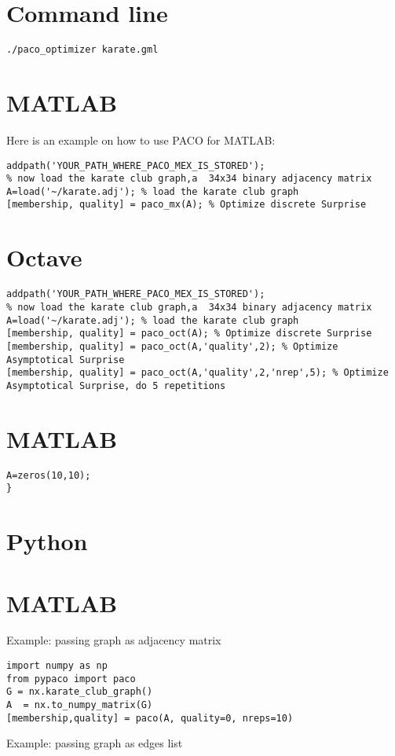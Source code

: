 \documentclass[11pt,%
              a4paper,%
]{article}
\begin{document}
\section{Command line}
\begin{verbatim}
./paco_optimizer karate.gml
\end{verbatim}

\section{MATLAB}
Here is an example on how to use PACO for MATLAB:

\begin{verbatim}
addpath('YOUR_PATH_WHERE_PACO_MEX_IS_STORED');
% now load the karate club graph,a  34x34 binary adjacency matrix
A=load('~/karate.adj'); % load the karate club graph
[membership, quality] = paco_mx(A); % Optimize discrete Surprise
\end{verbatim}


\section{Octave}
\begin{verbatim}
addpath('YOUR_PATH_WHERE_PACO_MEX_IS_STORED');
% now load the karate club graph,a  34x34 binary adjacency matrix
A=load('~/karate.adj'); % load the karate club graph
[membership, quality] = paco_oct(A); % Optimize discrete Surprise
[membership, quality] = paco_oct(A,'quality',2); % Optimize Asymptotical Surprise
[membership, quality] = paco_oct(A,'quality',2,'nrep',5); % Optimize Asymptotical Surprise, do 5 repetitions
\end{verbatim}


\section{MATLAB}
\begin{verbatim}
A=zeros(10,10);
}
\end{verbatim}
\section{Python}
\section{MATLAB}
Example: passing graph as adjacency matrix

\begin{verbatim}
import numpy as np
from pypaco import paco
G = nx.karate_club_graph()
A  = nx.to_numpy_matrix(G)
[membership,quality] = paco(A, quality=0, nreps=10)
\end{verbatim}  
Example: passing graph as edges list
\end{document}
